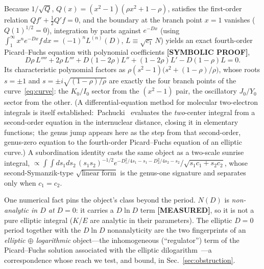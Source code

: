 \documentclass[aps,pra,twocolumn,superscriptaddress,longbibliography]{revtex4-2}
\begin{document}
Because $1/\sqrt{Q}$, $Q(x)=(x^{2}-1)(\rho x^{2}+1-\rho)$, satisfies the
first-order relation $Q f' + \tfrac12 Q' f = 0$, and the boundary at the
branch point $x=1$ vanishes ($Q(1)^{1/2}=0$), integration by parts against
$e^{-Dx}$ (using $\int_{1}^{\infty}x^{n}e^{-Dx}f\,dx=(-1)^{n}L^{(n)}(D)$,
$L\equiv\sqrt{c_{1}}\,N$) yields an exact fourth-order Picard--Fuchs equation
with polynomial coefficients \textbf{[SYMBOLIC PROOF]},
%
\begin{equation}
  D\rho\,L'''' + 2\rho\,L''' + D(1{-}2\rho)L'' + (1{-}2\rho)L'
  - D(1{-}\rho)L = 0.
  \label{eq:pf}
\end{equation}
%
Its characteristic polynomial factors as
$\rho(s^{2}-1)\big(s^{2}+(1-\rho)/\rho\big)$, whose roots $s=\pm1$ and
$s=\pm i\sqrt{(1-\rho)/\rho}$ are exactly the four branch points of the
curve~\eqref{eq:curve}: the $K_{0}/I_{0}$ sector from the $(x^{2}-1)$ pair,
the oscillatory $J_{0}/Y_{0}$ sector from the other.  (A differential-equation
method for molecular two-electron integrals is itself established:\
Pachucki~\cite{pachucki2009} evaluates the \emph{two}-center integral from a
second-order equation in the internuclear distance, closing it in elementary
functions;\ the genus jump appears here as the step from that second-order,
genus-zero equation to the fourth-order Picard--Fuchs equation of an elliptic
curve.)  A subordination
identity casts the same object as a two-scale sunrise integral,
$\propto\int\!\!\int ds_{1}ds_{2}\,(s_{1}s_{2})^{-1/2}
e^{-D_{1}^{2}/4s_{1}-s_{1}-D_{2}^{2}/4s_{2}-s_{2}}/\sqrt{s_{1}c_{1}+s_{2}c_{2}}$,
whose second-Symanzik-type $\sqrt{\text{linear form}}$ is the genus-one
signature and separates only when $c_{1}=c_{2}$.

One numerical fact pins the object's class beyond the period.  $N(D)$ is
\emph{non-analytic in $D$ at $D=0$}: it carries a $D\ln D$ term
\textbf{[MEASURED]}, so it is not a pure elliptic integral ($K$/$E$ are
analytic in their parameters).  The elliptic $D=0$ period together with the
$D\ln D$ nonanalyticity are the two fingerprints of an
\emph{elliptic ${\oplus}$ logarithmic} object---the inhomogeneous
(``regulator'') term of the Picard--Fuchs solution associated with the elliptic
dilogarithm~\cite{blochvanhove2015,adamsbognerweinzierl2014,broedel_sunrise2018}---a
correspondence whose reach we test, and bound, in
Sec.~\ref{sec:obstruction}.
\end{document}
